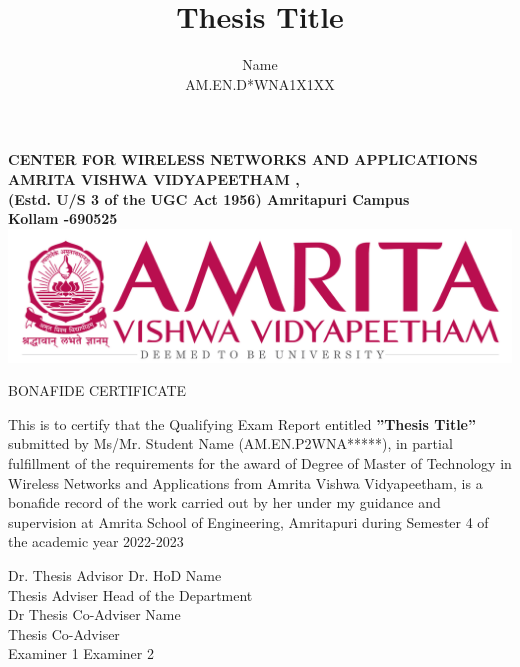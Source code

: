\documentclass[oneside,times, 11pt,numbered,onehalfspacing]{CUEDthesisPSnPDF}
\title{Thesis Title}
\author{Name \\ AM.EN.D*WNA1X1XX}
\begin{document}
\maketitle
{}
\begin{center}
{\normalsize {\bfseries{ CENTER FOR WIRELESS NETWORKS AND APPLICATIONS	\\[1ex]}}}
{\normalsize {\bfseries{AMRITA VISHWA VIDYAPEETHAM ,\\[1ex] (Estd. U/S 3 of the UGC Act 1956) Amritapuri  Campus \\[1ex] Kollam -690525\\[1ex]}}}
	\includegraphics[scale=1]{figs/amrita-logo.png}
	\rmfamily\bfseries\upshape\Large
	
	
BONAFIDE CERTIFICATE \\[2ex] %
\end{center}
\hspace{1.2 cm}This  is  to  certify  that  the Qualifying Exam Report  entitled  \textbf{''Thesis Title''} submitted by Ms/Mr. Student Name (AM.EN.P2WNA*****), in partial fulfillment of the requirements for the award of Degree of Master of Technology in Wireless Networks and Applications from Amrita Vishwa Vidyapeetham, is a bonafide record of the work carried out by her under my guidance and supervision at Amrita School of Engineering, Amritapuri during Semester 4 of the academic year 2022-2023
\vspace{30pt}
\begin{flushleft}
Dr. Thesis Advisor \hspace{140pt} Dr. HoD Name\\
\vspace{3pt}
Thesis Adviser \hspace{190pt} Head of the Department\\
\vspace{30pt}
Dr Thesis Co-Adviser Name\hspace{140pt}\\
\vspace{3pt}
Thesis Co-Adviser\\
\vspace{35pt} 
Examiner 1   \hspace{209pt} Examiner 2 \\              
\end{flushleft}
\end{document}
